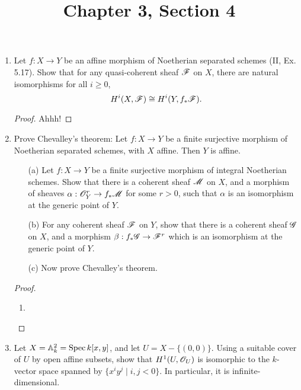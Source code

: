 \documentclass{article}
\title{Chapter 3, Section 4}
\begin{document}
\maketitle
\begin{enumerate} [label=\textbf{\arabic*.}, leftmargin=0em]

\item Let $f : X \to Y$ be an affine morphism of Noetherian separated schemes (II, Ex. 5.17).
Show that for any quasi-coherent sheaf $\mathscr{F}$ on $X$, there are natural isomorphisms for all $i \geq 0$,
\begin{equation*}
  H^i(X, \mathscr{F}) \cong H^i(Y, f_* \mathscr{F}).
\end{equation*}

\begin{proof}
  Ahhh!
\end{proof}

\item Prove Chevalley's theorem: Let $f : X \to Y$ be a finite surjective morphism of Noetherian separated schemes, with $X$ affine.
Then $Y$ is affine.
\begin{itemize}
  \item[(a)] Let $f : X \to Y$ be a finite surjective morphism of integral Noetherian schemes.
  Show that there is a coherent sheaf $\mathscr{M}$ on $X$, and a morphism of sheaves $\alpha : \mathscr{O}_Y^r \to f_* \mathscr{M}$ for some $r > 0$, such that $\alpha$ is an isomorphism at the generic point of $Y$.

  \item[(b)] For any coherent sheaf $\mathscr{F}$ on $Y$, show that there is a coherent sheaf $\mathscr{G}$ on $X$, and a morphism $\beta : f_* \mathscr{G} \to \mathscr{F}^r$ which is an isomorphism at the generic point of $Y$. 

  \item[(c)] Now prove Chevalley's theorem.
\end{itemize}

\begin{proof} $ $ \vspace{0pt}
\begin{enumerate} [label=(\alph*), leftmargin=0cm]
\item 
\end{enumerate} 
\end{proof}

\item Let $X = \mathbb{A}_k^2 = \operatorname{Spec}{k[x, y]}$, and let $U = X - \{ (0, 0) \}$.
Using a suitable cover of $U$ by open affine subsets, show that $H^1(U, \mathscr{O}_U)$ is isomorphic to the $k$-vector space spanned by $\{ x^i y^j \mid i, j < 0 \}$.
In particular, it is infinite-dimensional.


\end{enumerate}
\end{document}
